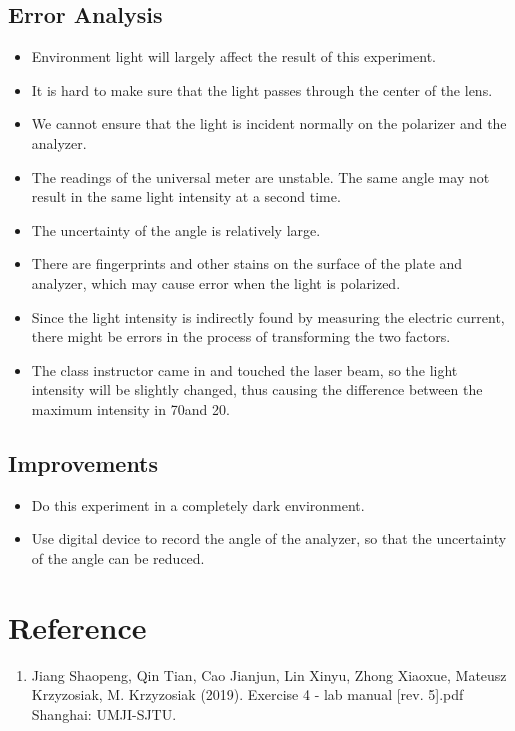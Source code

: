 \documentclass[12pt,a4paper]{article}
\begin{document}
\subsection{Error Analysis}
\begin{itemize}
    \item Environment light will largely affect the result of this experiment.
    \item It is hard to make sure that the light passes through the center of the lens.
    \item We cannot ensure that the light is incident normally on the polarizer and the analyzer.
	\item The readings of the universal meter are unstable. The same angle may not result in the same light intensity at a second time.
	\item The uncertainty of the angle is relatively large.
	\item There are fingerprints and other stains on the surface of the plate and analyzer, which may cause error when the light is polarized. 
	\item Since the light intensity is indirectly found by measuring the electric current, there might be errors in the process of transforming the two factors.
	\item The class instructor came in and touched the laser beam, so the light intensity will be slightly changed, thus causing the difference between the maximum intensity in 70\degree and 20\degree.
\end{itemize}
	

\subsection{Improvements}
\begin{itemize}
    \item Do this experiment in a completely dark environment.
    \item Use digital device to record the angle of the analyzer, so that the uncertainty of the angle can be reduced.
\end{itemize}

\section{Reference}
\begin{enumerate}[1.]
    \item Jiang Shaopeng, Qin Tian, Cao Jianjun, Lin Xinyu, Zhong Xiaoxue, Mateusz Krzyzosiak, M. Krzyzosiak (2019). Exercise 4 - lab manual [rev. 5].pdf Shanghai: UMJI-SJTU.
\end{enumerate}
\end{document}
